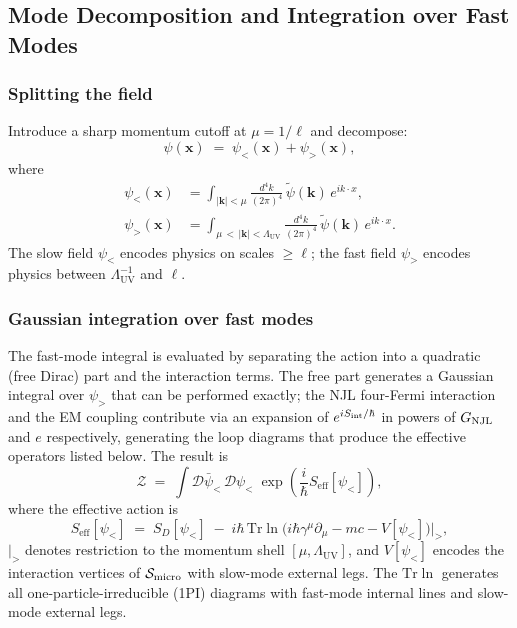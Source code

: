 \documentclass[11pt,a4paper]{article}
\theoremstyle{definition}
\theoremstyle{remark}
\begin{document}
	\subsection{Mode Decomposition and Integration over Fast Modes}
	\label{sec:mode_int}
	
	\subsubsection{Splitting the field}
	
	Introduce a sharp momentum cutoff at $\mu = 1/\ell$ and decompose:
	\begin{equation}
		\psi(\mathbf{x}) \;=\; \psi_{<}(\mathbf{x}) + \psi_{>}(\mathbf{x}),
		\label{eq:field_split}
	\end{equation}
	where
	\begin{align}
		\psi_{<}(\mathbf{x})
		&= \int_{|\mathbf{k}|<\mu}
		\frac{d^4k}{(2\pi)^4}\,\tilde{\psi}(\mathbf{k})\,e^{ik\cdot x},\\
		\psi_{>}(\mathbf{x})
		&= \int_{\mu\,<\,|\mathbf{k}|<\Lambda_{\mathrm{UV}}}
		\frac{d^4k}{(2\pi)^4}\,\tilde{\psi}(\mathbf{k})\,e^{ik\cdot x}.
	\end{align}
	The slow field $\psi_{<}$ encodes physics on scales $\geq \ell$; the fast field
	$\psi_{>}$ encodes physics between $\Lambda_{\mathrm{UV}}^{-1}$ and $\ell$.
	
	\subsubsection{Gaussian integration over fast modes}

	The fast-mode integral is evaluated by separating the action into a quadratic (free Dirac) part and the interaction terms.  The free part generates a Gaussian integral over $\psi_{>}$ that can be performed exactly; the NJL four-Fermi interaction and the EM coupling contribute via an expansion of $e^{iS_{\rm int}/\hbar}$ in powers of $G_{\rm NJL}$ and $e$ respectively, generating the loop diagrams that produce the effective operators listed below.  The result is
	\begin{equation}
		\mathcal{Z} \;=\;
		\int \mathcal{D}\bar{\psi}_{<}\,\mathcal{D}\psi_{<}\;
		\exp\!\left(\frac{i}{\hbar}S_{\mathrm{eff}}[\psi_{<}]\right),
		\label{eq:effective_pi}
	\end{equation}
	where the effective action is
	\begin{equation}
		S_{\mathrm{eff}}[\psi_{<}]
		\;=\; S_D[\psi_{<}]
		\;-\; i\hbar\,\mathrm{Tr}\ln
		\bigl(i\hbar\gamma^\mu\partial_\mu - mc - V[\psi_{<}]\bigr)
		\Big|_{>},
		\label{eq:Seff_exact}
	\end{equation}
	$|_{>}$ denotes restriction to the momentum shell $[\mu, \Lambda_{\mathrm{UV}}]$, and $V[\psi_{<}]$ encodes the interaction vertices of $\mathcal{S}_{\rm micro}$ with slow-mode external legs.  The $\mathrm{Tr}\ln$ generates all one-particle-irreducible (1PI) diagrams with fast-mode internal lines and slow-mode external legs.
	
\end{document}
